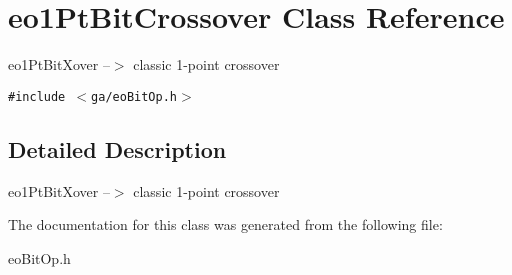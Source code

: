 \section{eo1Pt\-Bit\-Crossover Class Reference}
\label{classeo1_pt_bit_crossover}
eo1Pt\-Bit\-Xover --$>$ classic 1-point crossover  


{\tt \#include $<$ga/eo\-Bit\-Op.h$>$}



\subsection{Detailed Description}
eo1Pt\-Bit\-Xover --$>$ classic 1-point crossover 



The documentation for this class was generated from the following file:\begin{CompactItemize}
\item 
eo\-Bit\-Op.h\end{CompactItemize}
